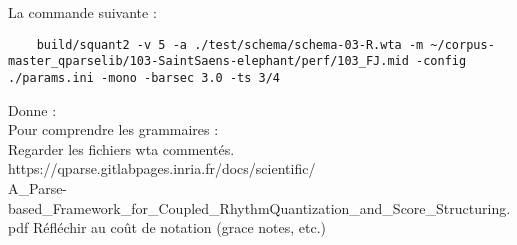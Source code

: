 La commande suivante :
\begin{verbatim}
	build/squant2 -v 5 -a ./test/schema/schema-03-R.wta -m ~/corpus-master_qparselib/103-SaintSaens-elephant/perf/103_FJ.mid -config ./params.ini -mono -barsec 3.0 -ts 3/4	
\end{verbatim}
Donne :\\

Pour comprendre les grammaires :\\
Regarder les fichiers wta commentés.\\
https://qparse.gitlabpages.inria.fr/docs/scientific/\\
A\_Parse-based\_Framework\_for\_Coupled\_RhythmQuantization\_and\_Score\_Structuring.pdf
Réfléchir au coût de notation (grace notes, etc.)
\newpage